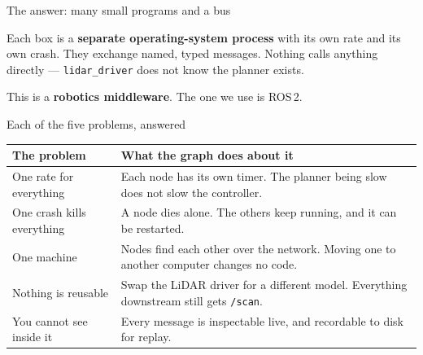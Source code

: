 \documentclass[aspectratio=169]{beamer}
\begin{document}
\begin{frame}{The answer: many small programs and a bus}
  \begin{center}
  \end{center}

  \vspace{0.3em}
  \small
  Each box is a \textbf{separate operating-system process} with its own rate and its own
  crash. They exchange named, typed messages. Nothing calls anything directly ---
  \texttt{lidar\_driver} does not know the planner exists.

  \vspace{0.3em}
  This is a \textbf{robotics middleware}. The one we use is ROS\,2.
\end{frame}

\begin{frame}{Each of the five problems, answered}
  \small
  \begin{center}
  \begin{tabular}{@{}p{5.2cm}p{6.2cm}@{}}
    \toprule
    \textbf{The problem} & \textbf{What the graph does about it} \\
    \midrule
    One rate for everything & Each node has its own timer. The planner being slow does not slow the controller. \\[0.3em]
    One crash kills everything & A node dies alone. The others keep running, and it can be restarted. \\[0.3em]
    One machine & Nodes find each other over the network. Moving one to another computer changes no code. \\[0.3em]
    Nothing is reusable & Swap the LiDAR driver for a different model. Everything downstream still gets \texttt{/scan}. \\[0.3em]
    You cannot see inside it & Every message is inspectable live, and recordable to disk for replay. \\
    \bottomrule
  \end{tabular}
  \end{center}
\end{frame}
\end{document}
